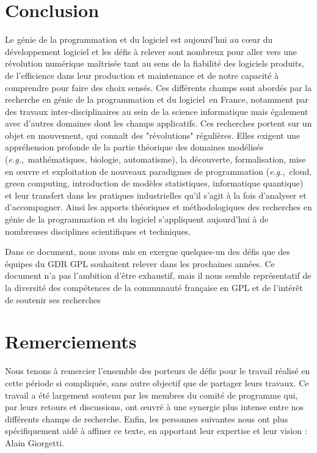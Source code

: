\documentclass[11pt]{article}
\newcommand{\gpl}[0]{génie de la programmation et du logiciel\xspace}
\newcommand{\eg}[0]{\emph{e.g.},~}
\begin{document}
\section{Conclusion}
Le \gpl est aujourd'hui au c{\oe}ur du développement logiciel et les défis à relever sont nombreux pour aller vers une révolution numérique  maîtrisée tant au sens de la fiabilité des logiciels produits, de l'efficience dans leur production et maintenance et de notre capacité à comprendre pour faire des choix sensés. Ces différents champs sont abordés par la recherche en \gpl~en France, notamment par des travaux inter-disciplinaires au sein de la science informatique mais également avec d'autres domaines dont les champs applicatifs. 
Ces recherches  portent sur un objet en mouvement, qui connaît des "révolutions" régulières. Elles
exigent une appréhension profonde de la partie théorique des domaines modélisés (\eg mathématiques, biologie, automatisme), la découverte, formalisation, mise en {\oe}uvre et exploitation de nouveaux paradigmes de programmation (\eg  cloud, green computing, introduction de modèles statistiques, informatique quantique) et leur transfert dans les pratiques industrielles qu'il s'agit à la fois d'analyser et d'accompagner. 
Ainsi les apports théoriques et méthodologiques des recherches en \gpl s’appliquent aujourd'hui à de nombreuses disciplines scientifiques et techniques.

Dans ce document, nous avons mis en exergue quelques-un des défis que des
équipes du GDR GPL souhaitent relever dans les prochaines années. Ce document
n’a pas l’ambition d’être exhaustif, mais il nous semble représentatif de la diversité
des compétences de la communauté française en GPL et de l’intérêt de soutenir ses
recherches



\section*{Remerciements}
Nous tenons à remercier l'ensemble des porteurs de défis pour le travail réalisé en cette période si compliquée, sans autre objectif que de partager leurs travaux. Ce travail a été largement soutenu par les membres du comité de programme qui, par leurs retours et discussions, ont {\oe}uvré à une synergie plus intense entre nos différents champs de recherche.
Enfin, les personnes suivantes nous ont plus spécifiquement aidé à affiner ce texte, en apportant leur expertise et leur vision : Alain Giorgetti.
\end{document}
